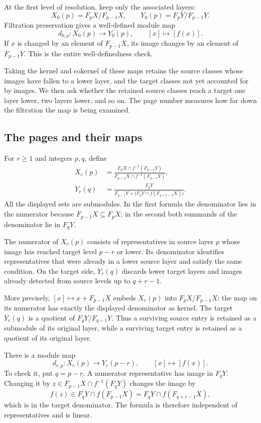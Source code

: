 At the first level of resolution, keep only the associated layers:
\[
X_0(p)=F_pX/F_{p-1}X,\qquad
Y_0(p)=F_pY/F_{p-1}Y.
\]
Filtration preservation gives a well-defined module map
\[
d_{0,p}:X_0(p)\longrightarrow Y_0(p),\qquad [x]\longmapsto[f(x)].
\]
If $x$ is changed by an element of $F_{p-1}X$, its image changes by an
element of $F_{p-1}Y$. This is the entire well-definedness check.

Taking the kernel and cokernel of these maps retains the source classes
whose images have fallen to a lower layer, and the target classes not yet
accounted for by images. We then ask whether the retained source classes
reach a target one layer lower, two layers lower, and so on. The page
number measures how far down the filtration the map is being examined.

\subsection{The pages and their maps}

For $r\geq1$ and integers $p,q$, define
\begin{align}
X_r(p)
&=
\frac{F_pX\cap f^{-1}(F_{p-r}Y)}
     {F_{p-1}X\cap f^{-1}(F_{p-r}Y)},
\label{s:source-page}\\[3pt]
Y_r(q)
&=
\frac{F_qY}
     {F_{q-1}Y+\bigl(F_qY\cap f(F_{q+r-1}X)\bigr)}.
\label{s:target-page}
\end{align}
All the displayed sets are submodules. In the first formula the
denominator lies in the numerator because $F_{p-1}X\subseteq F_pX$;
in the second both summands of the denominator lie in $F_qY$.

The numerator of $X_r(p)$ consists of representatives in source layer $p$
whose image has reached target level $p-r$ or lower. Its denominator
identifies representatives that were already in a lower source layer
and satisfy the same condition. On the target side, $Y_r(q)$ discards
lower target layers and images already detected from source levels up
to $q+r-1$.

More precisely, $[x]\mapsto x+F_{p-1}X$ embeds $X_r(p)$ into
$F_pX/F_{p-1}X$: the map on its numerator has exactly the displayed
denominator as kernel.
The target $Y_r(q)$ is a quotient of $F_qY/F_{q-1}Y$. Thus a surviving
source entry is retained as a submodule of its original layer, while a
surviving target entry is retained as a quotient of its original layer.

There is a module map
\begin{equation}\label{s:page-differential}
d_{r,p}:X_r(p)\longrightarrow Y_r(p-r),\qquad[x]\longmapsto[f(x)].
\end{equation}
To check it, put $q=p-r$. A numerator representative has image in $F_qY$.
Changing it by
$z\in F_{p-1}X\cap f^{-1}(F_qY)$ changes the image by
\[
f(z)\in F_qY\cap f(F_{p-1}X)
       =F_qY\cap f(F_{q+r-1}X),
\]
which is in the target denominator. The formula is therefore independent
of representatives and is linear.

